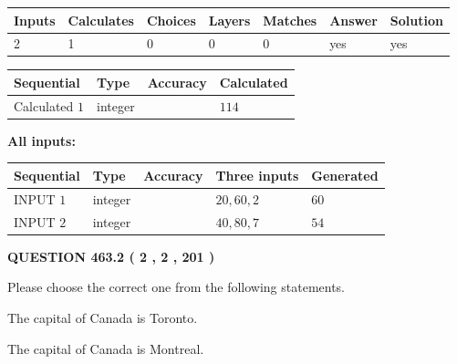 \documentclass[12pt]{article}
\begin{document}
   
   
   
\noindent\begin{tabular}{|l|l|l|l|l|l|l|}
 \hline
Inputs & Calculates & Choices & Layers & Matches & Answer & Solution \\ \hline
 2  & 
 1  & 
 0
  & 
 0  & 
 0  & 
  yes & 
  yes 
  \\ \hline
 \end{tabular}
   
   
   
   
\noindent{}
   
   
  
  
\noindent\begin{tabular}{|l|l|l|l|}
\hline
 Sequential & Type & Accuracy & Calculated \\ 
\hline
 
 
  Calculated $  1 $ & integer &  & 
  $ 114 $ 
 \\  \hline  
 \end{tabular}
   
   
   
   
\noindent\vspace{0.1in}\hspace{-0.08in} {\textbf{\Large{All inputs: }}}
   
   
  
  
\noindent\begin{tabular}{|l|l|l|l|l|}
\hline
 Sequential & Type & Accuracy & Three inputs & Generated \\ 
\hline
 
 
  INPUT $  1 $ & integer &  & $
 20
 , 
 60
 , 
 2
 $ & $ 60 $ 
 \\  \hline  
 
 
  INPUT $  2 $ & integer &  & $
 40
 , 
 80
 , 
 7
 $ & $ 54 $ 
 \\  \hline  
 \end{tabular}
   
   
  
\vspace{0.2in}
  
{\textbf{\Large{QUESTION
463.2 
 ( 2 , 2 , 201 )
}}}
  
  
Please choose the correct one from the following statements.
 
 
The capital of Canada is Toronto.
 
 
The capital of Canada is Montreal.
 
\end{document}
